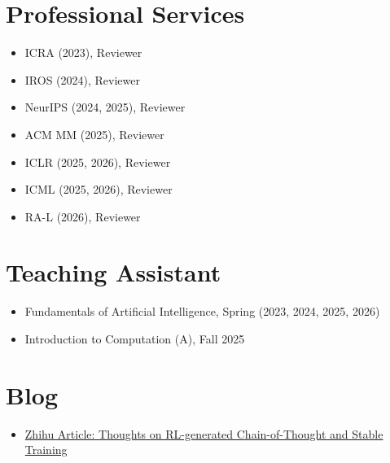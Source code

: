 \documentclass[a4paper,10pt]{article}
\begin{document}
\section*{Professional Services}
\begin{itemize}
    \item ICRA (2023), Reviewer
    \item IROS (2024), Reviewer
    \item NeurIPS (2024, 2025), Reviewer
    \item ACM MM (2025), Reviewer
    \item ICLR (2025, 2026), Reviewer
    \item ICML (2025, 2026), Reviewer
    \item RA-L (2026), Reviewer
\end{itemize}

\section*{Teaching Assistant}
\begin{itemize}
    \item Fundamentals of Artificial Intelligence, Spring (2023, 2024, 2025, 2026)
    \item Introduction to Computation (A), Fall 2025
\end{itemize}

\section*{Blog}
\begin{itemize}
    \item \href{https://zhuanlan.zhihu.com/p/21297297778}{Zhihu Article: Thoughts on RL-generated Chain-of-Thought and Stable Training}
\end{itemize}
\end{document}
